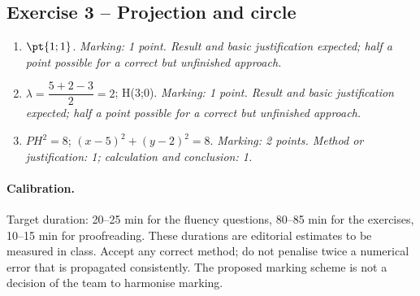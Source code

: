 \subsection*{Exercise 3 -- Projection and circle}
\begin{enumerate}
\item $\pt{1;1}$. \textit{Marking: 1 point. Result and basic justification expected; half a point possible for a correct but unfinished approach.}
\item $\lambda =\dfrac{5+2-3}{2}=2$; H(3;0). \textit{Marking: 1 point. Result and basic justification expected; half a point possible for a correct but unfinished approach.}
\item $PH^2=8$; $(x-5)^2+(y-2)^2=8$. \textit{Marking: 2 points. Method or justification: 1; calculation and conclusion: 1.}
\end{enumerate}
\paragraph{Calibration.} Target duration: 20--25 min for the fluency questions, 80--85 min for the exercises, 10--15 min for proofreading. These durations are editorial estimates to be measured in class. Accept any correct method; do not penalise twice a numerical error that is propagated consistently. The proposed marking scheme is not a decision of the team to harmonise marking.
